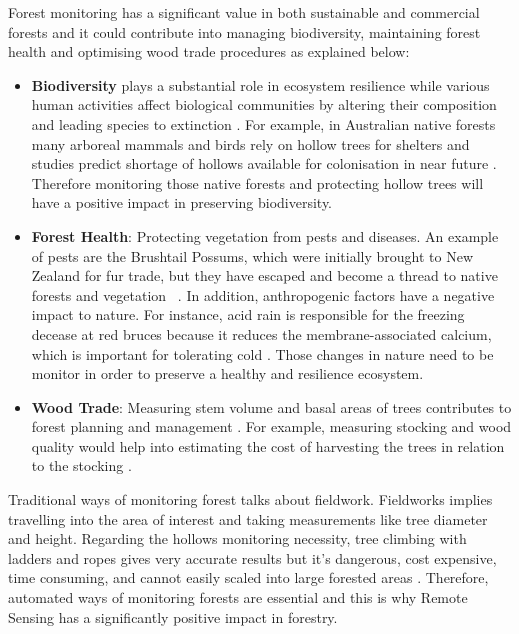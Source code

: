 \documentclass{subfiles}
\begin{document}
Forest monitoring has a significant value in both sustainable and commercial forests and it could contribute into managing biodiversity, maintaining forest health and optimising wood trade procedures as explained below: 
\begin{itemize}
 \item \textbf{Biodiversity} plays a substantial role in ecosystem resilience \cite{Elmqvist2003} while various human activities affect biological communities by altering their composition and leading species to extinction \cite{Hooper2005}.  For example, in Australian native forests many arboreal mammals and birds rely on hollow trees for shelters \cite{Lindenmayer2010} and studies predict shortage of hollows available for colonisation in near future \cite{Goldingay2009}\cite{Gibbons2002}. Therefore monitoring those native forests and protecting hollow trees will have a positive impact in preserving biodiversity.
 \item \textbf{Forest Health}: Protecting vegetation from pests and diseases. An example of pests are the Brushtail Possums, which were initially brought to New Zealand for fur trade, but they have escaped and become a thread to native forests and vegetation ~\cite{DepartementOfConversation2014}. In addition, anthropogenic factors have a negative impact to nature. For instance, acid rain is responsible for the freezing decease at red bruces because it reduces the membrane-associated calcium, which is important for tolerating cold 
 \cite{DeHayes1999}. Those changes in nature need to be monitor in order to preserve a healthy and resilience ecosystem. 

 
 \item \textbf{Wood Trade}:  Measuring stem volume and basal areas of trees contributes to forest planning and management \cite{Holmgren2004}. For example, measuring stocking and wood quality would help into estimating the cost of harvesting the trees in relation to the stocking \cite{Susana2015}.
 
\end{itemize}
 
Traditional ways of monitoring forest talks about fieldwork. Fieldworks implies travelling into the area of interest and taking measurements like tree diameter and height. Regarding the hollows monitoring necessity, tree climbing with ladders and ropes gives very accurate results but it's dangerous, cost expensive, time consuming, and cannot easily scaled into large forested areas \cite{Harper2004}\cite{Rayner2011}. Therefore, automated ways of monitoring forests are essential and this is why Remote Sensing has a significantly positive impact in forestry. 
 
\end{document}
